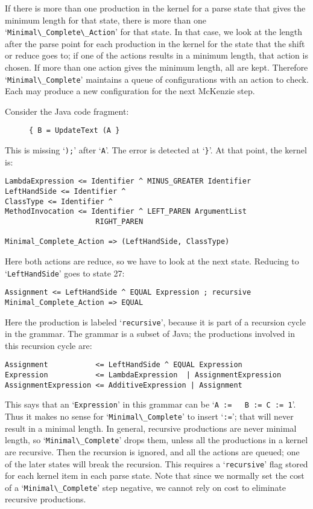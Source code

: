 \documentclass{article}
\newcommand{\code}[1]{`\lstinline|#1|'}
\begin{document}
If there is more than one production in the kernel for a parse state
that gives the minimum length for that state, there is more than one\\
\code{Minimal\_Complete\_Action} for that state. In that case, we look
at the length after the parse point for each production in the kernel
for the state that the shift or reduce goes to; if one of the actions
results in a minimum length, that action is chosen. If more than one
action gives the minimum length, all are kept. Therefore
\code{Minimal\_Complete} maintains a queue of configurations with an
action to check. Each may produce a new configuration for the next
McKenzie step.

Consider the Java code fragment:
\begin{figure}[H]
\begin{lstlisting}
{ B = UpdateText (A }
\end{lstlisting}
\caption{}
\label{ex:recursive_length_after_dot}
\end{figure}
This is missing \code{);} after \code{A}. The error is detected at
`\lstinline|}|'. At that point, the kernel is:
\begin{verbatim}
LambdaExpression <= Identifier ^ MINUS_GREATER Identifier
LeftHandSide <= Identifier ^
ClassType <= Identifier ^
MethodInvocation <= Identifier ^ LEFT_PAREN ArgumentList
                     RIGHT_PAREN

Minimal_Complete_Action => (LeftHandSide, ClassType)
\end{verbatim}
Here both actions are reduce, so we have to look at the next state.
Reducing to \code{LeftHandSide} goes to state 27:
\begin{verbatim}
Assignment <= LeftHandSide ^ EQUAL Expression ; recursive
Minimal_Complete_Action => EQUAL
\end{verbatim}
Here the production is labeled \code{recursive}, because it is part of
a recursion cycle in the grammar. The grammar is a subset of Java; the
productions involved in this recursion cycle are:
\begin{verbatim}
Assignment           <= LeftHandSide ^ EQUAL Expression
Expression           <= LambdaExpression  | AssignmentExpression
AssignmentExpression <= AdditiveExpression | Assignment
\end{verbatim}
This says that an \code{Expression} in this grammar can be \code{A :=
  B := C := 1}. Thus it makes no sense for \code{Minimal\_Complete} to
insert \code{:=}; that will never result in a minimal length. In
general, recursive productions are never minimal length, so
\code{Minimal\_Complete} drops them, unless all the productions in a
kernel are recursive. Then the recursion is ignored, and all the
actions are queued; one of the later states will break the recursion.
This requires a \code{recursive} flag stored for each kernel item in
each parse state. Note that since we normally set the cost of a
\code{Minimal\_Complete} step negative, we cannot rely on cost to
eliminate recursive productions.
\end{document}
